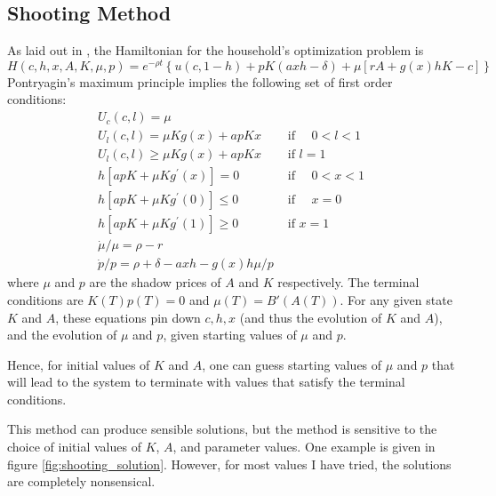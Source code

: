 \documentclass[12pt]{article}
\begin{document}
\subsection{Shooting Method}
As laid out in \textcite{blinder_weiss_1976_lifecycle_human_capital_labor_supply_synthesis}, the Hamiltonian for the household's optimization problem is
\begin{equation}
    H(c, h, x, A, K, \mu, p) = e^{-\rho t} \left\{ u(c, 1-h) + p K (axh - \delta) + \mu \left[ rA + g(x) h K - c \right] \right\}
\end{equation}
Pontryagin's maximum principle implies the following set of first order conditions:
\begin{align}
    U_{c}(c, l) =\mu \\
    U_{l}(c, l) =\mu K g(x)+a p K x \quad &\text { if } \quad 0<l<1 \\
    U_{l}(c, l) \geq \mu K g(x)+a p K x \quad &\text { if } l=1 \\
    h\left[a p K+\mu K g^{\prime}(x)\right]=0 \quad &\text { if } \quad 0<x<1 \\
    h\left[a p K+\mu K g^{\prime}(0)\right] \leq 0 \quad &\text { if } \quad x=0 \\
    h\left[a p K+\mu K g^{\prime}(1)\right] \geq 0 \quad &\text { if } x=1 \\
    \dot{\mu} / \mu=\rho-r & \\
    \dot{p} / p=\rho+\delta-a x h-g(x) h \mu / p
\end{align}
where $\mu$ and $p$ are the shadow prices of $A$ and $K$ respectively. 
The terminal conditions are $K(T)p(T) = 0$ and $\mu(T) = B'(A(T))$.
For any given state $K$ and $A$, these equations pin down $c, h, x$ (and thus the evolution of $K$ and $A$), and the evolution of $\mu$ and $p$, given starting values of $\mu$ and $p$.

Hence, for initial values of $K$ and $A$, one can guess starting values of $\mu$ and $p$ that will lead to the system to terminate with values that satisfy the terminal conditions.

This method can produce sensible solutions, but the method is sensitive to the choice of initial values of $K$, $A$, and parameter values.
One example is given in figure \ref{fig:shooting_solution}.
However, for most values I have tried, the solutions are completely nonsensical.
\end{document}
